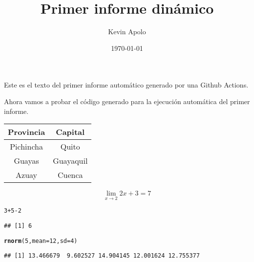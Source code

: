 \documentclass[12pt, a4paper]{book}\usepackage[]{graphicx}\usepackage[]{xcolor}
\title{Primer informe dinámico}
\author{Kevin Apolo}
\date{\today}
\makeatletter
\newcommand{\hlnum}[1]{\textcolor[rgb]{0.686,0.059,0.569}{#1}}%
\newcommand{\hlopt}[1]{\textcolor[rgb]{0,0,0}{#1}}%
\newcommand{\hldef}[1]{\textcolor[rgb]{0.345,0.345,0.345}{#1}}%
\newcommand{\hlkwc}[1]{\textcolor[rgb]{0.333,0.667,0.333}{#1}}%
\newcommand{\hlkwd}[1]{\textcolor[rgb]{0.737,0.353,0.396}{\textbf{#1}}}%
\newenvironment{kframe}{%
 \def\at@end@of@kframe{}%
 \ifinner\ifhmode%
  \def\at@end@of@kframe{\end{minipage}}%
  \begin{minipage}{\columnwidth}%
 \fi\fi%
 \def\FrameCommand##1{\hskip\@totalleftmargin \hskip-\fboxsep
 \colorbox{shadecolor}{##1}\hskip-\fboxsep
     \hskip-\linewidth \hskip-\@totalleftmargin \hskip\columnwidth}%
 \MakeFramed {\advance\hsize-\width
   \@totalleftmargin\z@ \linewidth\hsize
   \@setminipage}}%
 {\par\unskip\endMakeFramed%
 \at@end@of@kframe}
\newenvironment{knitrout}{}{} %
\makeatother
\begin{document}
\maketitle

Este es el texto del primer informe automático generado por una Github Actions.\newline

Ahora vamos a probar el código generado para la ejecución automática del primer informe.\newline

\begin{table}[H]
\centering
\begin{tabular}{|c|c|}\hline
\textbf{Provincia} & \textbf{Capital}\\ \hline
Pichincha & Quito\\ \hline
Guayas & Guayaquil\\ \hline
Azuay & Cuenca\\ \hline
\end{tabular}
\end{table}

$$\lim_{x \rightarrow 2} 2x+3 = 7$$

\begin{knitrout}
\color{fgcolor}\begin{kframe}
\begin{alltt}
\hlnum{3} \hlopt{+} \hlnum{5} \hlopt{-} \hlnum{2}
\end{alltt}
\begin{verbatim}
## [1] 6
\end{verbatim}
\begin{alltt}
\hlkwd{rnorm}\hldef{(}\hlnum{5}\hldef{,} \hlkwc{mean} \hldef{=} \hlnum{12}\hldef{,} \hlkwc{sd} \hldef{=} \hlnum{4}\hldef{)}
\end{alltt}
\begin{verbatim}
## [1] 13.466679  9.602527 14.904145 12.001624 12.755377
\end{verbatim}
\end{kframe}
\end{knitrout}
\end{document}
